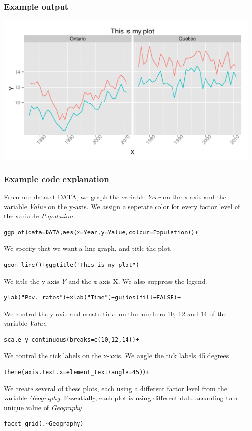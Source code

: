 \documentclass[nogin]{beamer}\usepackage[]{graphicx}\usepackage[]{color}
\makeatletter
\def\maxwidth{ %
  \ifdim\Gin@nat@width>\linewidth
    \linewidth
  \else
    \Gin@nat@width
  \fi
}
\newenvironment{knitrout}{}{} %
\makeatother
\begin{document}
\begin{frame}[fragile]
\frametitle{Example output}
\begin{knitrout}
\color{fgcolor}
\includegraphics[width=\maxwidth]{figure/unnamed-chunk-4} 

\end{knitrout}

\end{frame}

\begin{frame}[fragile]
\frametitle{Example code explanation}
\scriptsize
From our dataset DATA, we graph the variable \emph{Year} on the x-axis and the variable \emph{Value} on the y-axis. We assign a seperate color for every  factor level of the variable \emph{Population}.
\begin{verbatim}ggplot(data=DATA,aes(x=Year,y=Value,colour=Population))+\end{verbatim}
We specify that we want a line graph, and title the plot.
\begin{verbatim}geom_line()+gggtitle("This is my plot")\end{verbatim}
We title the y-axis \emph{Y} and the x-axis {X}. We also suppress the legend.
\begin{verbatim}ylab("Pov. rates")+xlab("Time")+guides(fill=FALSE)+\end{verbatim}
We control the y-axis and create ticks on the numbers 10, 12 and 14 of the variable \emph{Value}.
\begin{verbatim}scale_y_continuous(breaks=c(10,12,14))+ \end{verbatim}
We control the tick labels on the x-axis. We angle the tick labels 45 degrees
\begin{verbatim}theme(axis.text.x=element_text(angle=45))+
\end{verbatim}
We create several of these plots, each using a different factor level from the variable \emph{Geography}. Essentially, each plot is using different data according to a unique value of \emph{Geography}
\begin{verbatim}facet_grid(.~Geography)\end{verbatim}
\end{frame}
\end{document}
